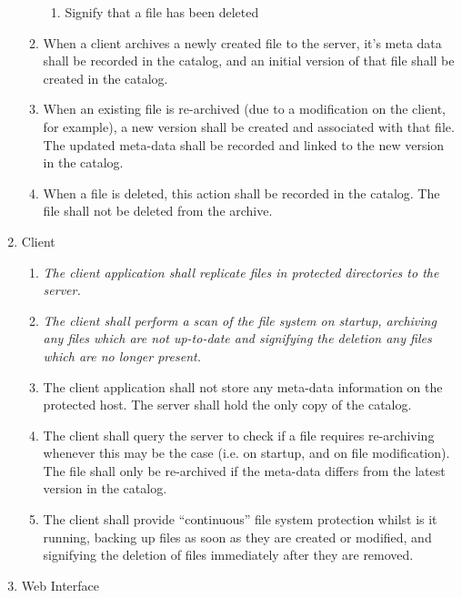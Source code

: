 \begin{enumerate}
\begin{enumerate}
\begin{enumerate}
                    \item Signify that a file has been deleted
                \end{enumerate}
            \item When a client archives a newly created file to the server,
                it's meta data shall be recorded in the catalog, and an initial
                version of that file shall be created in the catalog.
            \item When an existing file is re-archived (due to a modification
                on the client, for example), a new version shall be created and
                associated with that file. The updated meta-data shall be
                recorded and linked to the new version in the catalog.
            \item When a file is deleted, this action shall be recorded in the
                catalog. The file shall not be deleted from the archive.
        \end{enumerate}
    \item Client
        \begin{enumerate}
            \item \emph{The client application shall replicate files in
                protected directories to the server.}
            \item \emph{The client shall perform a scan of the file system on
                startup, archiving any files which are not up-to-date and
                signifying the deletion any files which are no longer present.}
            \item The client application shall not store any meta-data
                information on the protected host. The server shall hold the
                only copy of the catalog.
            \item The client shall query the server to check if a file
                requires re-archiving whenever this may be the case (i.e. on
                startup, and on file modification). The file shall only be
                re-archived if the meta-data differs from the latest version in
                the catalog.
            \item The client shall provide ``continuous'' file system
                protection whilst is it running, backing up files as soon as
                they are created or modified, and signifying the deletion of
                files immediately after they are removed.
        \end{enumerate}
    \item Web Interface

\end{enumerate}

